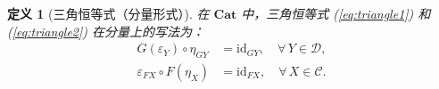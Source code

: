 \documentclass[12pt,a4paper]{ctexart}
\newtheorem{definition}{定义}[section]
\theoremstyle{definition}
\newcommand{\cat}[1]{\mathbf{#1}}
\newcommand{\Cat}{\cat{Cat}}
\newcommand{\id}{\mathrm{id}}
\begin{document}
\begin{definition}[三角恒等式（分量形式）]
在 $\Cat$ 中，三角恒等式 (\ref{eq:triangle1}) 和 (\ref{eq:triangle2}) 在分量上的写法为：
\begin{align*}
G(\varepsilon_Y) \circ \eta_{GY} &= \id_{GY}, \quad \forall\, Y \in \mathcal{D},\\
\varepsilon_{FX} \circ F(\eta_X) &= \id_{FX}, \quad \forall\, X \in \mathcal{C}.
\end{align*}
\end{definition}
\end{document}

